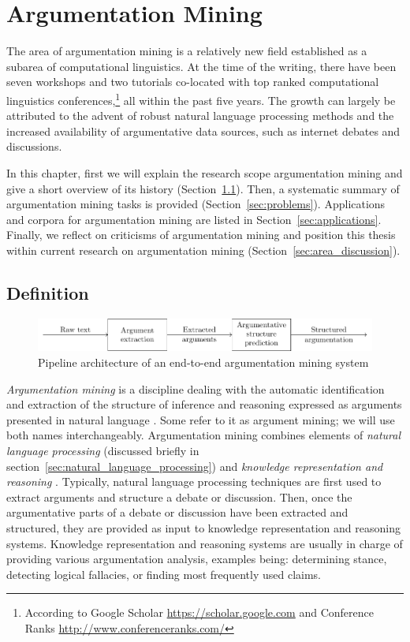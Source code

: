\chapter{Argumentation Mining}
\label{chap:argmin}

The area of argumentation mining is a relatively new field established as a
subarea of computational linguistics.  At the time of the writing, there have
been seven workshops and two tutorials co-located with top ranked computational
linguistics conferences,\footnote{According to Google Scholar
\url{https://scholar.google.com} and Conference Ranks
\url{http://www.conferenceranks.com/}} all within the past five years. The
growth can largely be attributed to the advent of robust natural language
processing methods and the increased availability of argumentative data sources,
such as internet debates and discussions. 

In this chapter, first we will explain the research scope argumentation
mining and give a short overview of its history (Section~\ref{sec:definition}).
Then, a systematic summary of argumentation mining tasks is provided
(Section~\ref{sec:problems}). Applications and corpora for argumentation mining 
are listed in Section~\ref{sec:applications}. 
Finally, we reflect on criticisms of argumentation mining
and position this thesis within current research on argumentation mining
(Section~\ref{sec:area_discussion}).

\section{Definition}
\label{sec:definition}

\begin{figure}[t]
	\includegraphics{area_description_pipeline-figure0.pdf}
	\caption{Pipeline architecture of an end-to-end argumentation mining 
	system}
	\label{fig:pipeline}
\end{figure}

\emph{Argumentation mining} is a discipline dealing with the automatic
identification and extraction of the structure of inference and reasoning
expressed as arguments presented in natural language
\citep{lawrence2019argument}.  Some refer to it as argument mining; we will use
both names interchangeably.  Argumentation mining combines elements of
\emph{natural language processing} (discussed briefly in
section~\ref{sec:natural_language_processing}) and \emph{knowledge
representation and reasoning} \citep{cabrio2018five}.  Typically, natural
language processing techniques are first used to extract arguments and
structure a debate or discussion. Then, once the argumentative parts of a
debate or discussion have been extracted and structured, they are provided as
input to knowledge representation and reasoning systems.  Knowledge
representation and reasoning systems are usually in charge of providing various
argumentation analysis, examples being: determining stance,
detecting logical fallacies, or finding most frequently used claims.

